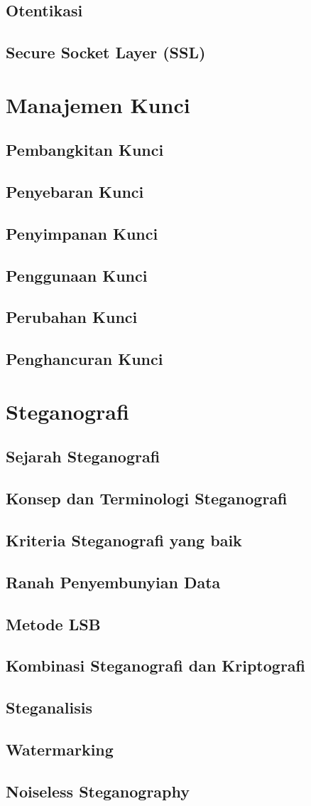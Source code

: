 \documentclass{book}
\begin{document}
     \section{Otentikasi}
     \section{Secure Socket Layer (SSL)}
\chapter{Manajemen Kunci}
     \section{Pembangkitan Kunci}
     \section{Penyebaran Kunci}
     \section{Penyimpanan Kunci}
     \section{Penggunaan Kunci}
     \section{Perubahan Kunci}
     \section{Penghancuran Kunci}
\chapter{Steganografi}
     \section{Sejarah Steganografi}
     \section{Konsep dan Terminologi Steganografi}
     \section{Kriteria Steganografi yang baik}
     \section{Ranah Penyembunyian Data}
     \section{Metode LSB}
     \section{Kombinasi Steganografi dan Kriptografi}
     \section{Steganalisis}
     \section{Watermarking}
     \section{Noiseless Steganography}
\end{document}
